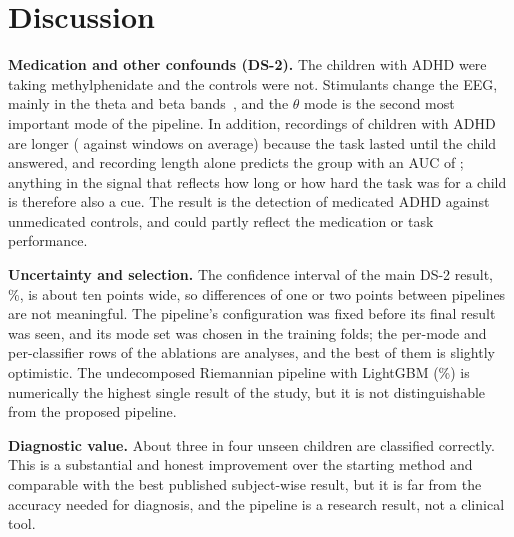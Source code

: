 \section{Discussion}
\textbf{Medication and other confounds (DS-2).} The children with ADHD were taking
methylphenidate and the controls were not. Stimulants change the EEG, mainly in the theta and
beta bands~\cite{clarke2002}, and the $\theta$ mode is the second most important mode of the
pipeline. In addition, recordings of children with ADHD are longer ( against
 windows on average) because the task lasted until the child answered, and
recording length alone predicts the group with an AUC of ; anything in the signal
that reflects how long or how hard the task was for a child is therefore also a cue. The result
is the detection of medicated ADHD against unmedicated controls, and could partly reflect the
medication or task performance.

\textbf{Uncertainty and selection.} The confidence interval of the main DS-2 result,
\%, is about ten points wide, so differences of one or two points between
pipelines are not meaningful. The pipeline's configuration was fixed before its final result was
seen, and its mode set was chosen in the training folds; the per-mode and per-classifier rows of
the ablations are analyses, and the best of them is slightly optimistic. The undecomposed
Riemannian pipeline with LightGBM (\%) is numerically the highest single result
of the study, but it is not distinguishable from the proposed pipeline.

\textbf{Diagnostic value.} About three in four unseen children are classified correctly. This is
a substantial and honest improvement over the starting method and comparable with the best
published subject-wise result, but it is far from the accuracy needed for diagnosis, and the
pipeline is a research result, not a clinical tool.
